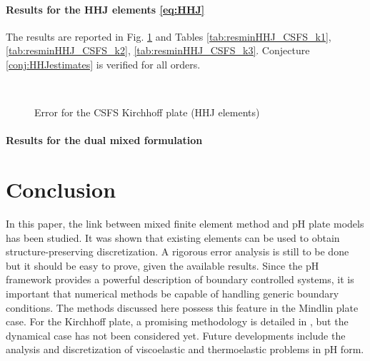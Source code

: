 \paragraph{Results for the HHJ elements \eqref{eq:HHJ}}
The results are reported in Fig. \ref{fig:errorHHJ_CSSF} and Tables \ref{tab:resminHHJ_CSFS_k1}, \ref{tab:resminHHJ_CSFS_k2}, \ref{tab:resminHHJ_CSFS_k3}. Conjecture \ref{conj:HHJestimates} is verified for all orders.

\begin{figure}[h]%
	\centering
	\hspace{8pt}%
	 \\
	\caption{Error for the CSFS Kirchhoff plate (HHJ elements)}%
	\label{fig:errorHHJ_CSSF}%
\end{figure}



\paragraph{Results for the dual mixed formulation}


\section{Conclusion}
In this paper, the link between mixed finite element method and pH plate models has been studied. It was shown that existing elements can be used to obtain structure-preserving discretization. A rigorous error analysis is still to be done but it should be easy to prove, given the available results. Since the pH framework provides a powerful description of boundary controlled systems, it is important that numerical methods be capable of handling generic boundary conditions. The methods discussed here possess this feature in the Mindlin plate case. For the Kirchhoff plate, a promising methodology is detailed in \cite{rafetseder2018siam}, but the dynamical case has not been considered yet. Future developments include the analysis and discretization of viscoelastic and thermoelastic problems in pH form.
